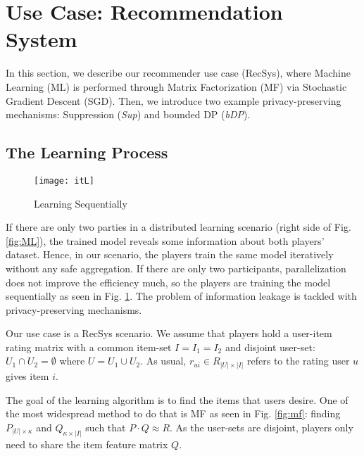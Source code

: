 \documentclass[USenglish,oneside,twocolumn]{article}
\theoremstyle{plain}
\begin{document}
    \vspace{-0.5cm}
    \section{Use Case: Recommendation System}
    \label{sec:set}
    \vspace{-0.25cm}
    
    In this section, we describe our recommender use case (RecSys), where Machine Learning (ML) is performed through Matrix Factorization (MF) via Stochastic Gradient Descent (SGD). Then, we introduce two example privacy-preserving mechanisms: Suppression (\textit{Sup}) and bounded DP (\textit{bDP}).
    
    \vspace{-0.5cm}
    \subsection{The Learning Process}
    \vspace{-0.5cm}
    \begin{figure}[h]
        \centering
        \texttt{[image: itL]}
        \caption{Learning Sequentially}
        \label{fig:itL}
    \end{figure}
    \vspace{-0.25cm}
    
    If there are only two parties in a distributed learning scenario (right side of Fig. \ref{fig:ML}), the trained model reveals some information about both players' dataset. Hence, in our scenario, the players train the same model iteratively without any safe aggregation. If there are only two participants, parallelization does not improve the efficiency much, so the players are training the model sequentially as seen in Fig. \ref{fig:itL}. The problem of information leakage is tackled with privacy-preserving mechanisms.
    
    Our use case is a RecSys scenario. We assume that players hold a user-item rating matrix with a common item-set $I=I_1=I_2$ and disjoint user-set: $U_1\cap U_2=\emptyset$ where $U=U_1\cup U_2$. As usual, $r_{ui}\in R_{|U|\times|I|}$ refers to the rating user $u$ gives item $i$.
    
    The goal of the learning algorithm is to find the items that users desire. One of the most widespread method to do that is MF \cite{koren2009matrix} as seen in Fig. \ref{fig:mf}: finding $P_{|U|\times \kappa}$ and $Q_{\kappa\times|I|}$ such that $P\cdot Q\approx R$. As the user-sets are disjoint, players only need to share the item feature matrix $Q$. 
    
\end{document}
